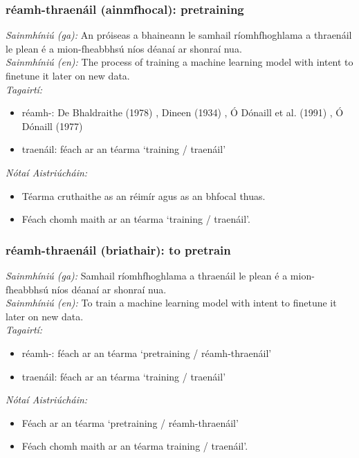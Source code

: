 \documentclass{article}
\begin{document}
\subsubsection*{réamh-thraenáil (ainmfhocal): pretraining}
 \noindent \textit{Sainmhíniú (ga):} An próiseas a bhaineann le samhail ríomhfhoghlama a thraenáil le plean é a mion-fheabbhsú níos déanaí ar shonraí nua.
\\
 \noindent \textit{Sainmhíniú (en):} The process of training a machine learning model with intent to finetune it later on new data.
\\
 \noindent \textit{Tagairtí:}
\begin{itemize}
	\item réamh-: De Bhaldraithe (1978) \cite{de-bhaldraithe}, Dineen (1934) \cite{dineen}, Ó Dónaill et al. (1991) \cite{focloir-beag}, Ó Dónaill (1977) \cite{odonaill}
	\item traenáil: féach ar an téarma `training / traenáil'
\end{itemize}

 \noindent \textit{Nótaí Aistriúcháin:}
\begin{itemize}
	\item Téarma cruthaithe as an réimír agus as an bhfocal thuas.
	\item Féach chomh maith ar an téarma `training / traenáil'.
\end{itemize}


\subsubsection*{réamh-thraenáil (briathair): to pretrain}
 \noindent \textit{Sainmhíniú (ga):} Samhail ríomhfhoghlama a thraenáil le plean é a mion-fheabbhsú níos déanaí ar shonraí nua.
\\
 \noindent \textit{Sainmhíniú (en):} To train a machine learning model with intent to finetune it later on new data.
\\
 \noindent \textit{Tagairtí:}
\begin{itemize}
	\item réamh-: féach ar an téarma `pretraining / réamh-thraenáil'
	\item traenáil: féach ar an téarma `training / traenáil'
\end{itemize}

 \noindent \textit{Nótaí Aistriúcháin:}
\begin{itemize}
	\item Féach ar an téarma `pretraining / réamh-thraenáil'
	\item Féach chomh maith ar an téarma training / traenáil'.
\end{itemize}
\end{document}
